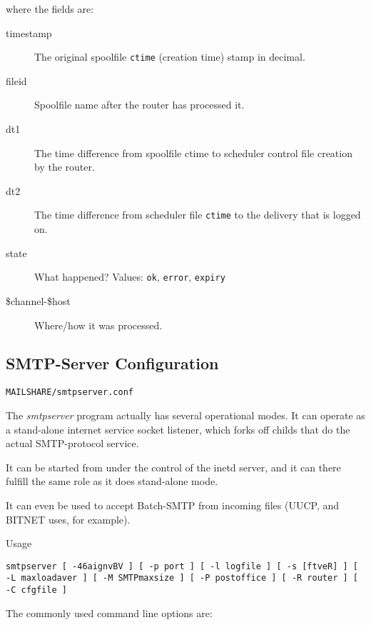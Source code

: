 where the fields are:
\begin{description}
\item[timestamp] \mbox{}

The original spoolfile {\tt ctime} (creation time)  stamp
in decimal.

\item[fileid] \mbox{}
Spoolfile name after the router has processed it.

\item[dt1] \mbox{}
The time difference from spoolfile ctime to 
scheduler control file creation by the router.

\item[dt2] \mbox{}
The time difference from scheduler file {\tt ctime} to
the delivery that is logged on.

\item[state] \mbox{}
What happened?  Values: {\tt ok}, {\tt error}, {\tt expiry}

\item[\$channel-\$host] \mbox{}
Where/how it was processed.

\end{description}









\subsection{SMTP-Server Configuration}

{\tt MAILSHARE/smtpserver.conf}

The {\em smtpserver\/} program actually has several operational modes.
It can operate as a stand-alone internet service socket listener, which
forks off childs that do the actual SMTP-protocol service.

It can be started from under the control of the inetd server, and it can
there fulfill the same role as it does stand-alone mode.

It can even be used to accept Batch-SMTP from incoming files (UUCP,
and BITNET uses, for example).

Usage

{\tt smtpserver [ -46aignvBV ] [ -p port ] [ -l logfile ] [ -s [ftveR] ] [ -L maxloadaver ] [ -M SMTPmaxsize ] [ -P postoffice ] [ -R router ] [ -C cfgfile ]}

The commonly used command line options are:

